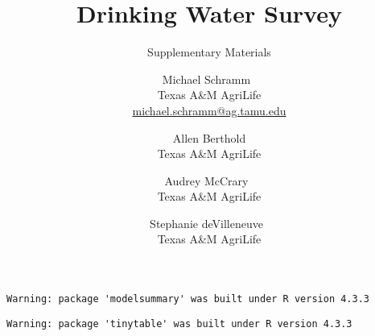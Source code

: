 \documentclass[
]{article}
\title{Drinking Water Survey}
\subtitle{Supplementary Materials}
\author{
{\large Michael Schramm~\orcidlink{0000-0003-1876-6592}}%
 \\%
Texas A\&M AgriLife \\%
{\footnotesize \url{michael.schramm@ag.tamu.edu}} \and
{\large Allen Berthold}%
 \\%
Texas A\&M AgriLife \\%
{\footnotesize \url{}} \and
{\large Audrey McCrary~\orcidlink{0000-0002-7061-6113}}%
 \\%
Texas A\&M AgriLife \\%
{\footnotesize \url{}} \and
{\large Stephanie deVilleneuve~\orcidlink{0009-0002-3984-035X}}%
 \\%
Texas A\&M AgriLife \\%
{\footnotesize \url{}} \and
}
\date{}
\newcommand{\published}[1]{%
   \gdef\puB{#1}}
\newcommand{\puB}{}
\begin{document}
\published{\textbf{}}

\maketitle





\begin{verbatim}
Warning: package 'modelsummary' was built under R version 4.3.3
\end{verbatim}

\begin{verbatim}
Warning: package 'tinytable' was built under R version 4.3.3
\end{verbatim}
\end{document}
